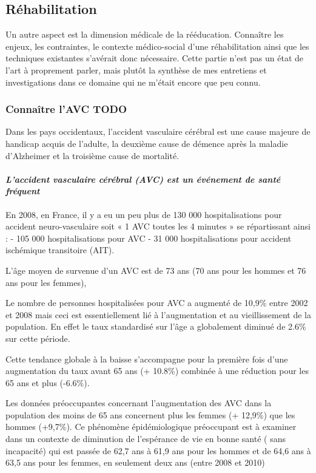 	\subsection{Réhabilitation}
Un autre aspect est la dimension médicale de la rééducation. Connaître les enjeux, les contraintes, le contexte médico-social d'une réhabilitation ainsi que les techniques existantes s'avérait donc nécessaire. Cette partie n'est pas un état de l'art à proprement parler, mais plutôt la synthèse de mes entretiens et investigations dans ce domaine qui ne m'était encore que peu connu.

	\subsubsection{Connaître l'AVC TODO}
Dans les pays occidentaux, l’accident vasculaire cérébral est une cause majeure de handicap acquis de l’adulte, la deuxième cause de démence après la maladie d’Alzheimer et la troisième cause de mortalité.

		\paragraph{\emph{L’accident vasculaire cérébral (AVC) est un événement de santé fréquent}\\}
    En 2008, en France, il y a eu un peu plus de 130 000 hospitalisations pour accident neuro-vasculaire soit « 1 AVC toutes les 4 minutes » se répartissant ainsi :
    - 105 000 hospitalisations pour AVC
    - 31 000 hospitalisations pour accident ischémique transitoire (AIT).

    L’âge moyen de survenue d’un AVC est de 73 ans (70 ans pour les hommes et 76 ans pour les femmes),

    Le nombre de personnes hospitalisées pour AVC a augmenté de 10,9\% entre 2002 et 2008 mais ceci est essentiellement lié à l’augmentation et au vieillissement de la population. En effet le taux standardisé sur l’âge a globalement diminué de 2.6\% sur cette période.

    Cette tendance globale à la baisse s’accompagne pour la première fois d’une augmentation du taux avant 65 ans (+ 10.8\%) combinée à une réduction pour les 65 ans et plus (-6.6\%).

    Les données préoccupantes concernant l’augmentation des AVC dans la population des moins de 65 ans concernent plus les femmes (+ 12,9\%) que les hommes (+9,7\%). Ce phénomène épidémiologique préoccupant est à examiner dans un contexte de diminution de l’espérance de vie en bonne santé ( sans incapacité) qui est passée de 62,7 ans à 61,9 ans pour les hommes et de 64,6 ans à 63,5 ans pour les femmes, en seulement deux ans (entre 2008 et 2010)

